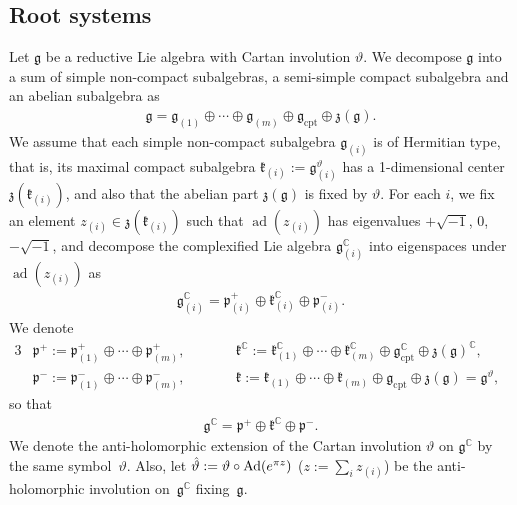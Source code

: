 \documentclass[11pt]{article}
\numberwithin{equation}{section}
\newcommand{\BC}{\mathbb{C}}
\newcommand{\fg}{\mathfrak{g}}
\newcommand{\fk}{\mathfrak{k}}
\newcommand{\fp}{\mathfrak{p}}
\newcommand{\fz}{\mathfrak{z}}
\begin{document}
\subsection{Root systems}\label{root_sys}
Let $\fg$ be a reductive Lie algebra with Cartan involution $\vartheta$. We decompose $\fg$ into a sum of simple non-compact subalgebras, a semi-simple compact subalgebra and an abelian subalgebra as
\begin{gather*} \fg=\fg_{(1)}\oplus\cdots\oplus\fg_{(m)}\oplus\fg_{\text{cpt}}\oplus\fz(\fg). \end{gather*}
We assume that each simple non-compact subalgebra $\fg_{(i)}$ is of Hermitian type, that is,
its maximal compact subalgebra $\fk_{(i)}:=\fg^\vartheta_{(i)}$ has a 1-dimensional center $\fz(\fk_{(i)})$, and also that the abelian part $\fz(\fg)$ is fixed by $\vartheta$. For each $i$, we fix an element $z_{(i)}\in\fz(\fk_{(i)})$ such that $\operatorname{ad}(z_{(i)})$ has eigenvalues $+\sqrt{-1}$, $0$, $-\sqrt{-1}$,
and decompose the complexified Lie algebra $\fg_{(i)}^\BC$ into eigenspaces under $\operatorname{ad}(z_{(i)})$ as
\begin{gather*} \fg_{(i)}^\BC=\fp^+_{(i)}\oplus \fk^\BC_{(i)}\oplus\fp^-_{(i)}. \end{gather*}
We denote
\begin{alignat*}{3}
& \fp^+ :=\fp^+_{(1)}\oplus\cdots\oplus\fp^+_{(m)},\qquad && \fk^\BC:=\fk_{(1)}^\BC\oplus\cdots\oplus\fk_{(m)}^\BC\oplus\fg_{\text{cpt}}^\BC\oplus\fz(\fg)^\BC,&\\
&\fp^-:=\fp^-_{(1)}\oplus\cdots\oplus\fp^-_{(m)},\qquad && \fk :=\fk_{(1)}\oplus\cdots\oplus\fk_{(m)}\oplus\fg_{\text{cpt}}\oplus\fz(\fg)=\fg^\vartheta,&
\end{alignat*}
so that
\begin{gather*} \fg^\BC=\fp^+\oplus\fk^\BC\oplus\fp^-. \end{gather*}
We denote the anti-holomorphic extension of the Cartan involution $\vartheta$ on $\fg^\BC$ by the same sym\-bol~$\vartheta$.
Also, let $\hat{\vartheta}:=\vartheta\circ \operatorname{Ad}({\rm e}^{\pi z})$ ($z:=\sum_i{z_{(i)}}$) be the anti-holomorphic involution on~$\fg^\BC$ fixing~$\fg$.
\end{document}
